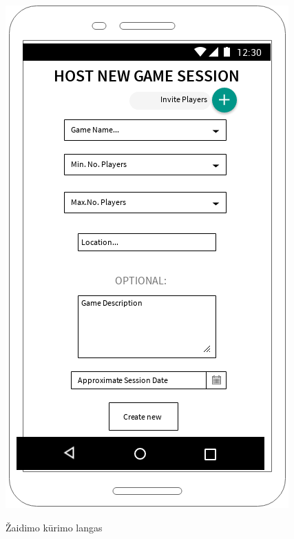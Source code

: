 \documentclass{VUMIFPSkursinis}
\begin{document}
\begin{figure}[H]
	\centering
	\caption{Žaidimo kūrimo langas}
	\includegraphics[scale=0.9]{img/host_game_window}
	\label{img:host_game_window}
\end{figure}
\end{document}
